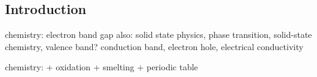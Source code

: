 
\subsection{Introduction}

chemistry: electron band gap
also: solid state physics, phase transition, solid-state chemistry, valence band? conduction band, electron hole, electrical conductivity

chemistry:
+ oxidation
+ smelting
+ periodic table



